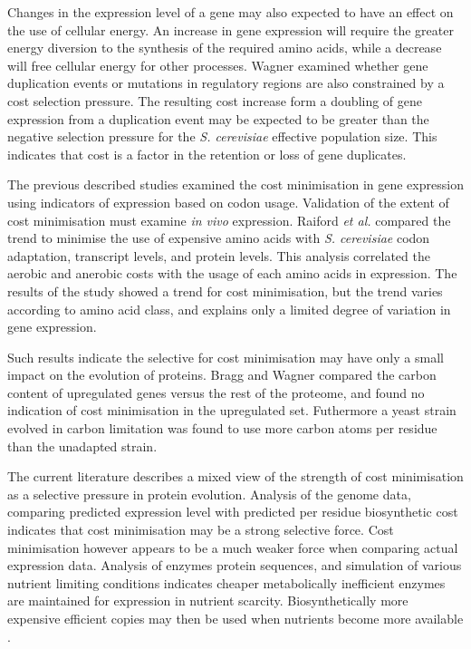 Changes in the expression level of a gene may also expected to have an effect on the use of cellular energy. An increase in gene expression will require the greater energy diversion to the synthesis of the required amino acids, while a decrease will free cellular energy for other processes. Wagner \cite{wagner2005} examined whether gene duplication events or mutations in regulatory regions are also constrained by a cost selection pressure. The resulting cost increase form a doubling of gene expression from a duplication event may be expected to be greater than the negative selection pressure for the \emph{S. cerevisiae} effective population size. This indicates that cost is a factor in the retention or loss of gene duplicates.

The previous described studies examined the cost minimisation in gene expression using indicators of expression based on codon usage. Validation of the extent of cost minimisation must examine \emph{in vivo} expression. Raiford \emph{et al.} \cite{raiford2008} compared the trend to minimise the use of expensive amino acids with \emph{S. cerevisiae} codon adaptation, transcript levels, and protein levels. This analysis correlated the aerobic and anerobic costs with the usage of each amino acids in expression. The results of the study showed a trend for cost minimisation, but the trend varies according to amino acid class, and explains only a limited degree of variation in gene expression.

Such results indicate the selective for cost minimisation may have only a small impact on the evolution of proteins. Bragg and Wagner \cite{bragg2007} compared the carbon content of upregulated genes versus the rest of the proteome, and found no indication of cost minimisation in the upregulated set. Futhermore a yeast strain evolved in carbon limitation was found to use more carbon atoms per residue than the unadapted strain.

The current literature describes a mixed view of the strength of cost minimisation as a selective pressure in protein evolution. Analysis of the genome data, comparing predicted expression level with predicted per residue biosynthetic cost indicates that cost minimisation may be a strong selective force. Cost minimisation however appears to be a much weaker force when comparing actual expression data. Analysis of enzymes protein sequences, and simulation of various nutrient limiting conditions indicates cheaper metabolically inefficient enzymes are maintained for expression in nutrient scarcity. Biosynthetically more expensive efficient copies may then be used when nutrients become more available \cite{carlson2007}.

